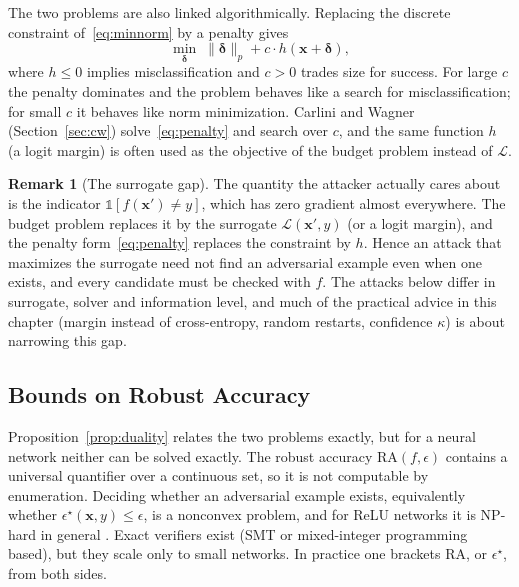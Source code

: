 \documentclass[10pt,a4paper]{extarticle}
\theoremstyle{definition}
\newtheorem{remark}{Remark}[section]
\newcommand{\Loss}{\mathcal{L}}
\newcommand{\x}{\mathbf{x}}
\newcommand{\xadv}{\mathbf{x}'}
\newcommand{\bdelta}{\boldsymbol{\delta}}
\begin{document}
The two problems are also linked algorithmically. Replacing the discrete constraint of~\eqref{eq:minnorm} by a penalty gives
\begin{equation}\label{eq:penalty}
\min_{\bdelta}\;\|\bdelta\|_p+c\cdot h(\x+\bdelta),
\end{equation}
where \(h\le0\) implies misclassification and \(c>0\) trades size for success. For large \(c\) the penalty dominates and the problem behaves like a search for misclassification; for small \(c\) it behaves like norm minimization. Carlini and Wagner (Section~\ref{sec:cw}) solve~\eqref{eq:penalty} and search over \(c\), and the same function \(h\) (a logit margin) is often used as the objective of the budget problem instead of \(\Loss\).

\begin{remark}[The surrogate gap]\label{rem:surrogate}
The quantity the attacker actually cares about is the indicator \(\mathbb{1}[f(\xadv)\neq y]\), which has zero gradient almost everywhere. The budget problem replaces it by the surrogate \(\Loss(\xadv,y)\) (or a logit margin), and the penalty form~\eqref{eq:penalty} replaces the constraint by \(h\). Hence an attack that maximizes the surrogate need not find an adversarial example even when one exists, and every candidate must be checked with \(f\). The attacks below differ in surrogate, solver and information level, and much of the practical advice in this chapter (margin instead of cross-entropy, random restarts, confidence \(\kappa\)) is about narrowing this gap.
\end{remark}

\subsection{Bounds on Robust Accuracy}\label{sec:bounds}

Proposition~\ref{prop:duality} relates the two problems exactly, but for a neural network neither can be solved exactly. The robust accuracy \(\mathrm{RA}(f,\epsilon)\) contains a universal quantifier over a continuous set, so it is not computable by enumeration. Deciding whether an adversarial example exists, equivalently whether \(\epsilon^\star(\x,y)\le\epsilon\), is a nonconvex problem, and for ReLU networks it is NP-hard in general \citep{katz2017reluplex}. Exact verifiers exist (SMT or mixed-integer programming based), but they scale only to small networks. In practice one brackets \(\mathrm{RA}\), or \(\epsilon^\star\), from both sides.
\end{document}
